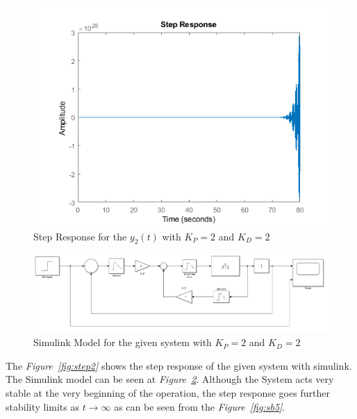 \documentclass[a4paper,12pt]{article}
\begin{document}
\begin{enumerate}
\begin{enumerate}
	 	 \begin{figure}[H]
	 		\center
	 		\setlength{\unitlength}{\textwidth} 
	 		\includegraphics[width=1.0\unitlength]{images/stepy2b}
	 		\caption{\label{fig:stepy2b} Step Response for the $y_2(t)$  with $K_P=2$ and $K_D=2$}
		 \end{figure}
		 
		\begin{figure}[H]
			\center
			\setlength{\unitlength}{\textwidth} 
			\includegraphics[width=1.0\unitlength]{images/simu2}
			\caption{\label{fig:simu2} Simulink Model for the given system with $K_P=2$ and $K_D=2$}
		\end{figure}
		
		The \textit{Figure~\ref{fig:step2}} shows the step response of the given system  with simulink. The Simulink model can be seen at \textit{Figure~\ref{fig:simu2}}. Although the System acts very stable at the very beginning of the operation, the step response goes further stability limits as $t \to \infty $ as can be seen from the \textit{Figure~\ref{fig:sb5}}. 
		

\end{enumerate}
\end{enumerate}
\end{document}
